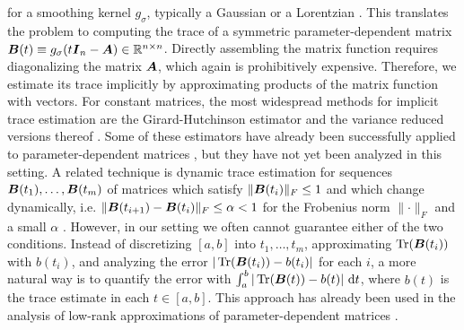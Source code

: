 \documentclass[12pt]{article}
\begin{document}
for a smoothing kernel $g_{\sigma}$, typically a Gaussian \cite{lin-2016-approximating-spectral, lin-2017-randomized-estimation} or a Lorentzian \cite{haydock-1972-electronic-structure, lin-2016-approximating-spectral}. This translates the problem to computing the trace of a symmetric parameter-dependent matrix $\boldsymbol{B}(t) \equiv g_{\sigma}(t \boldsymbol{I}_n - \boldsymbol{A}) \in \mathbb{R}^{n \times n}$. Directly assembling the matrix function requires diagonalizing the matrix $\boldsymbol{A}$, which again is prohibitively expensive. Therefore, we estimate its trace implicitly by approximating products of the matrix function with vectors. For constant matrices, the most widespread methods for implicit trace estimation are the Girard-Hutchinson estimator \cite{girard-1989-fast-montecarlo, hutchinson-1990-stochastic-estimator} and the variance reduced versions thereof \cite{gambhir-2017-deflation-method, saibaba-2017-randomized-matrixfree, lin-2017-randomized-estimation, meyer-2021-hutch-optimal, persson-2022-improved-variants, epperly-2024-xtrace-making, chen-2023-krylovaware-stochastic}. Some of these estimators have already been successfully applied to parameter-dependent matrices \cite{lin-2017-randomized-estimation,chen-2023-krylovaware-stochastic}, but they have not yet been analyzed in this setting. A related technique is dynamic trace estimation for sequences $\boldsymbol{B}(t_1), \dots, \boldsymbol{B}(t_m)$ of matrices which satisfy $\lVert \boldsymbol{B}(t_i) \rVert _F \leq 1$ and which change dynamically, i.e. $\lVert \boldsymbol{B}(t_{i+1}) - \boldsymbol{B}(t_i) \rVert _F \leq \alpha < 1$ for the Frobenius norm $\lVert \cdot \rVert _F$ and a small $\alpha$ \cite{woodruff-2022-optimal-query, dharangutte-2021-dynamic-trace}. However, in our setting we often cannot guarantee either of the two conditions. Instead of discretizing $[a, b]$ into $t_1, \ldots, t_m$, approximating $\operatorname{Tr}(\boldsymbol{B}(t_i))$ with $b(t_i)$, and analyzing the error $|\operatorname{Tr}(\boldsymbol{B}(t_i)) - b(t_i)|$ for each $i$, a more natural way is to quantify the error with $\int_{a}^{b} | \operatorname{Tr}(\boldsymbol{B}(t)) - b(t) |~\mathrm{d}t$, where $b(t)$ is the trace estimate in each $t \in [a, b]$. This approach has already been used in the analysis of low-rank approximations of parameter-dependent matrices \cite{kressner-2023-randomized-lowrank}.
\end{document}
